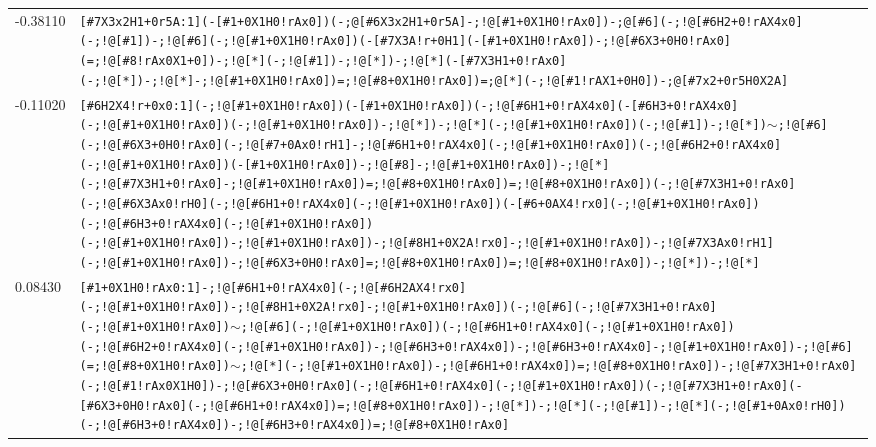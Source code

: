 \begin{longtable}{>{\baselineskip=10pt}p{} >{\baselineskip=10pt}p{}}
-0.38110 & \texttt{[\#7X3x2H1+0r5A:1](-[\#1+0X1H0!rAx0])(-;@[\#6X3x2H1+0r5A]-;!@[\#1+0X1H0!rAx0])-;@[\#6](-;!@[\#6H2+0!rAX4x0](-;!@[\#1])-;!@[\#6](-;!@[\#1+0X1H0!rAx0])(-[\#7X3A!r+0H1](-[\#1+0X1H0!rAx0])-;!@[\#6X3+0H0!rAx0](=;!@[\#8!rAx0X1+0])-;!@[*](-;!@[\#1])-;!@[*])-;!@[*](-[\#7X3H1+0!rAx0](-;!@[*])-;!@[*]-;!@[\#1+0X1H0!rAx0])=;!@[\#8+0X1H0!rAx0])=;@[*](-;!@[\#1!rAX1+0H0])-;@[\#7x2+0r5H0X2A]} \\ 
-0.11020 & \texttt{[\#6H2X4!r+0x0:1](-;!@[\#1+0X1H0!rAx0])(-[\#1+0X1H0!rAx0])(-;!@[\#6H1+0!rAX4x0](-[\#6H3+0!rAX4x0](-;!@[\#1+0X1H0!rAx0])(-;!@[\#1+0X1H0!rAx0])-;!@[*])-;!@[*](-;!@[\#1+0X1H0!rAx0])(-;!@[\#1])-;!@[*])$\sim$;!@[\#6](-;!@[\#6X3+0H0!rAx0](-;!@[\#7+0Ax0!rH1]-;!@[\#6H1+0!rAX4x0](-;!@[\#1+0X1H0!rAx0])(-;!@[\#6H2+0!rAX4x0](-;!@[\#1+0X1H0!rAx0])(-[\#1+0X1H0!rAx0])-;!@[\#8]-;!@[\#1+0X1H0!rAx0])-;!@[*](-;!@[\#7X3H1+0!rAx0]-;!@[\#1+0X1H0!rAx0])=;!@[\#8+0X1H0!rAx0])=;!@[\#8+0X1H0!rAx0])(-;!@[\#7X3H1+0!rAx0](-;!@[\#6X3Ax0!rH0](-;!@[\#6H1+0!rAX4x0](-;!@[\#1+0X1H0!rAx0])(-[\#6+0AX4!rx0](-;!@[\#1+0X1H0!rAx0])(-;!@[\#6H3+0!rAX4x0](-;!@[\#1+0X1H0!rAx0])(-;!@[\#1+0X1H0!rAx0])-;!@[\#1+0X1H0!rAx0])-;!@[\#8H1+0X2A!rx0]-;!@[\#1+0X1H0!rAx0])-;!@[\#7X3Ax0!rH1](-;!@[\#1+0X1H0!rAx0])-;!@[\#6X3+0H0!rAx0]=;!@[\#8+0X1H0!rAx0])=;!@[\#8+0X1H0!rAx0])-;!@[*])-;!@[*]} \\ 
0.08430 & \texttt{[\#1+0X1H0!rAx0:1]-;!@[\#6H1+0!rAX4x0](-;!@[\#6H2AX4!rx0](-;!@[\#1+0X1H0!rAx0])-;!@[\#8H1+0X2A!rx0]-;!@[\#1+0X1H0!rAx0])(-;!@[\#6](-;!@[\#7X3H1+0!rAx0](-;!@[\#1+0X1H0!rAx0])$\sim$;!@[\#6](-;!@[\#1+0X1H0!rAx0])(-;!@[\#6H1+0!rAX4x0](-;!@[\#1+0X1H0!rAx0])(-;!@[\#6H2+0!rAX4x0](-;!@[\#1+0X1H0!rAx0])-;!@[\#6H3+0!rAX4x0])-;!@[\#6H3+0!rAX4x0]-;!@[\#1+0X1H0!rAx0])-;!@[\#6](=;!@[\#8+0X1H0!rAx0])$\sim$;!@[*](-;!@[\#1+0X1H0!rAx0])-;!@[\#6H1+0!rAX4x0])=;!@[\#8+0X1H0!rAx0])-;!@[\#7X3H1+0!rAx0](-;!@[\#1!rAx0X1H0])-;!@[\#6X3+0H0!rAx0](-;!@[\#6H1+0!rAX4x0](-;!@[\#1+0X1H0!rAx0])(-;!@[\#7X3H1+0!rAx0](-[\#6X3+0H0!rAx0](-;!@[\#6H1+0!rAX4x0])=;!@[\#8+0X1H0!rAx0])-;!@[*])-;!@[*](-;!@[\#1])-;!@[*](-;!@[\#1+0Ax0!rH0])(-;!@[\#6H3+0!rAX4x0])-;!@[\#6H3+0!rAX4x0])=;!@[\#8+0X1H0!rAx0]} \\ 

\end{longtable}
